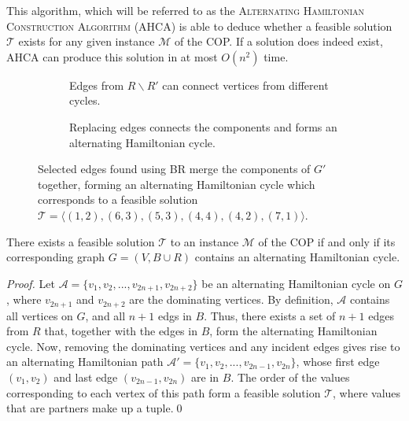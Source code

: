 \documentclass[oribibl]{llncs}
\begin{document}
This algorithm, which will be referred to as the \textsc{Alternating Hamiltonian Construction Algorithm} (AHCA) is able to deduce whether a feasible solution $\mathcal{T}$ exists for any given instance $\mathcal{M}$ of the COP. If a solution does indeed exist, AHCA can produce this solution in at most $O(n^2)$ time.

\begin{figure}	
	\centering
	\begin{subfigure}[H]{0.5\textwidth}
		
		\caption{Edges from $R\backslash R'$ can connect vertices from different cycles.}	
		\label{fig:mpsconnect}
	\end{subfigure}
	\begin{subfigure}[H]{0.5\textwidth}
		
		\caption{Replacing edges connects the components and forms an alternating Hamiltonian cycle.}	
		\label{fig:mpscycle}
	\end{subfigure}
	\caption{Selected edges found using BR merge the components of $G'$ together, forming an alternating Hamiltonian cycle which corresponds to a feasible solution $\mathcal{T} = \langle(1,2), (6,3), (5,3), (4,4), (4,2), (7,1) \rangle$.}
	\label{fig:connect/cycle}
\end{figure}


\begin{theorem}
	\label{thm:copsoln}
	There exists a feasible solution $\mathcal{T}$ to an instance $\mathcal{M}$ of the COP if and only if its corresponding graph $G=(V, B\cup R)$ contains an alternating Hamiltonian cycle.
\end{theorem}
\begin{proof}
	Let $\mathcal{A} = \{v_1, v_2, ..., v_{2n+1}, v_{2n+2}\}$ be an alternating Hamiltonian cycle on $G$, where $v_{2n+1}$ and $v_{2n+2}$ are the dominating vertices. By definition, $\mathcal{A}$ contains all vertices on $G$, and all $n+1$ edgs in $B$. Thus, there exists a set of $n+1$ edges from $R$ that, together with the edges in $B$, form the alternating Hamiltonian cycle. Now, removing the dominating vertices and any incident edges gives rise to an alternating Hamiltonian path $\mathcal{A}' = \{v_1, v_2, ..., v_{2n-1}, v_{2n}\}$, whose first edge $(v_1, v_2)$ and last edge $(v_{2n-1}, v_{2n})$ are in $B$. The order of the values corresponding to each vertex of this path form a feasible solution $\mathcal{T}$, where values that are partners make up a tuple.\qed
\end{proof}
\end{document}
